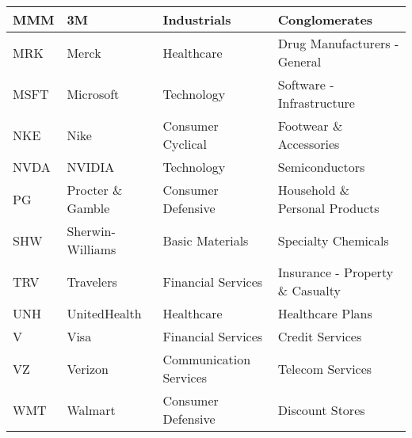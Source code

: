 \begin{longtable}{|p{2cm}|p{3cm}|p{4cm}|p{4cm}|}
MMM & 3M & Industrials & Conglomerates \\ \hline
MRK & Merck & Healthcare & Drug Manufacturers - General \\ \hline
MSFT & Microsoft & Technology & Software - Infrastructure \\ \hline
NKE & Nike & Consumer Cyclical & Footwear \& Accessories \\ \hline
NVDA & NVIDIA & Technology & Semiconductors \\ \hline
PG & Procter \& Gamble & Consumer Defensive & Household \& Personal Products \\ \hline
SHW & Sherwin-Williams & Basic Materials & Specialty Chemicals \\ \hline
TRV & Travelers & Financial Services & Insurance - Property \& Casualty \\ \hline
UNH & UnitedHealth & Healthcare & Healthcare Plans \\ \hline
V & Visa & Financial Services & Credit Services \\ \hline
VZ & Verizon & Communication Services & Telecom Services \\ \hline
WMT & Walmart & Consumer Defensive & Discount Stores \\ \hline
\end{longtable}
